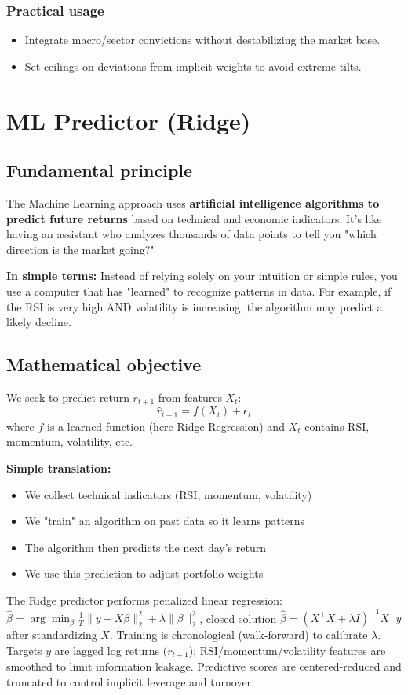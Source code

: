 \documentclass[11pt,a4paper]{article}
\begin{document}
\subsubsection*{Practical usage}
\begin{itemize}
  \item Integrate macro/sector convictions without destabilizing the market base.
  \item Set ceilings on deviations from implicit weights to avoid extreme tilts.
\end{itemize}

\FloatBarrier
\section{ML Predictor (Ridge)}

\subsection{Fundamental principle}
The Machine Learning approach uses \textbf{artificial intelligence algorithms to predict future returns} based on technical and economic indicators. It's like having an assistant who analyzes thousands of data points to tell you "which direction is the market going?"

\textbf{In simple terms:} Instead of relying solely on your intuition or simple rules, you use a computer that has "learned" to recognize patterns in data. For example, if the RSI is very high AND volatility is increasing, the algorithm may predict a likely decline.

\subsection{Mathematical objective}
We seek to predict return \(r_{t+1}\) from features \(X_t\):
\[\hat{r}_{t+1} = f(X_t) + \epsilon_t\]
where \(f\) is a learned function (here Ridge Regression) and \(X_t\) contains RSI, momentum, volatility, etc.

\textbf{Simple translation:} 
\begin{itemize}
\item We collect technical indicators (RSI, momentum, volatility)
\item We "train" an algorithm on past data so it learns patterns
\item The algorithm then predicts the next day's return
\item We use this prediction to adjust portfolio weights
\end{itemize}
\noindent The Ridge predictor performs penalized linear regression: \(\hat{\beta}=\arg\min_\beta \frac{1}{T}\lVert y - X\beta\rVert_2^2 + \lambda \lVert\beta\rVert_2^2\), closed solution \(\hat{\beta}=(X^\top X + \lambda I)^{-1}X^\top y\) after standardizing \(X\). Training is chronological (walk-forward) to calibrate \(\lambda\). Targets \(y\) are lagged log returns (\(r_{t+1}\)); RSI/momentum/volatility features are smoothed to limit information leakage. Predictive scores are centered-reduced and truncated to control implicit leverage and turnover.
\end{document}
